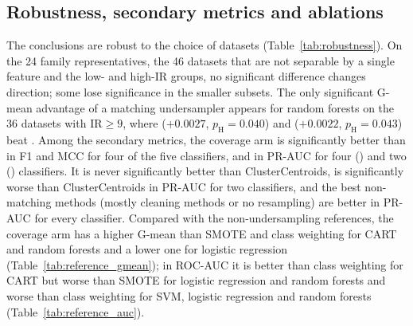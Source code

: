 \subsection{Robustness, secondary metrics and ablations}\label{sec:results:robustness}

The conclusions are robust to the choice of datasets (Table~\ref{tab:robustness}). On the 24 family representatives, the 46 datasets that are not separable by a single feature and the low- and high-IR groups, no significant difference changes direction; some lose significance in the smaller subsets. The only significant G-mean advantage of a matching undersampler appears for random forests on the 36 datasets with $\mathrm{IR}\ge9$, where \MUSCS{} ($+0.0027$, $p_\mathrm{H}=0.040$) and \MUSCO{} ($+0.0022$, $p_\mathrm{H}=0.043$) beat \RUS. Among the secondary metrics, the coverage arm is significantly better than \RUS{} in F1 and MCC for four of the five classifiers, and in PR-AUC for four (\MUSCO) and two (\MUSCS) classifiers. It is never significantly better than ClusterCentroids, \MUSCS{} is significantly worse than ClusterCentroids in PR-AUC for two classifiers, and the best non-matching methods (mostly cleaning methods or no resampling) are better in PR-AUC for every classifier. Compared with the non-undersampling references, the coverage arm has a higher G-mean than SMOTE and class weighting for CART and random forests and a lower one for logistic regression (Table~\ref{tab:reference_gmean}); in ROC-AUC it is better than class weighting for CART but worse than SMOTE for logistic regression and random forests and worse than class weighting for SVM, logistic regression and random forests (Table~\ref{tab:reference_auc}).

